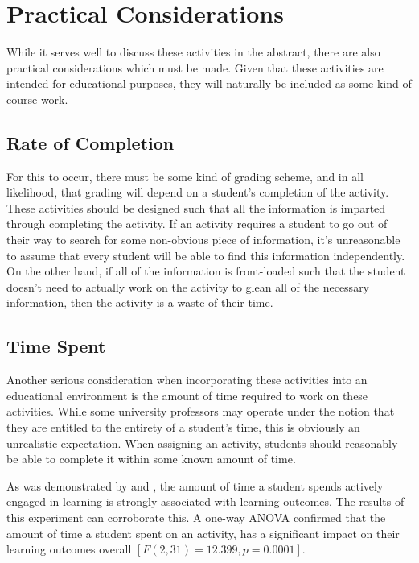 \section{Practical Considerations}
    While it serves well to discuss these activities in the abstract, there are also practical considerations which must be made. %
Given that these activities are intended for educational purposes, they will naturally be included as some kind of course work.

    \subsection{Rate of Completion}
         For this to occur, there must be some kind of grading scheme, and in all likelihood, that grading will depend on a student's completion of the activity. %
These activities should be designed such that all the information is imparted through completing the activity. %
If an activity requires a student to go out of their way to search for some non-obvious piece of information, it's unreasonable to assume that every student will be able to find this information independently. %
On the other hand, if all of the information is front-loaded such that the student doesn't need to actually work on the activity to glean all of the necessary information, then the activity is a waste of their time. 

        
    \subsection{Time Spent}
        Another serious consideration when incorporating these activities into an educational environment is the amount of time required to work on these activities. %
While some university professors may operate under the notion that they are entitled to the entirety of a student's time, this is obviously an unrealistic expectation. %
When assigning an activity, students should reasonably be able to complete it within some known amount of time. 
        
        As was demonstrated by \citeauthor{C-Linehan} and \citeauthor{Z-Zeng}, the amount of time a student spends actively engaged in learning is strongly associated with learning outcomes. %
The results of this experiment can corroborate this. %
A one-way ANOVA confirmed that the amount of time a student spent on an activity, has a significant impact on their learning outcomes overall $[F(2,31)=12.399, p=0.0001]$.
        
